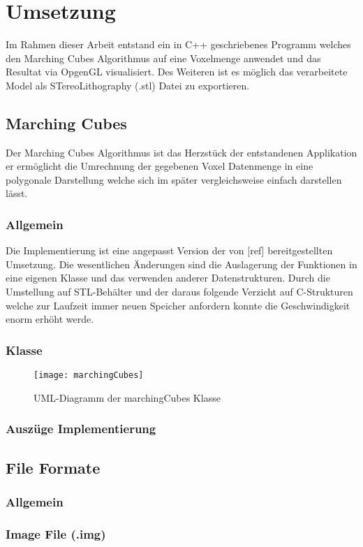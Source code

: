 \chapter{Umsetzung}
Im Rahmen dieser Arbeit entstand ein in C++ geschriebenes Programm welches den Marching Cubes Algorithmus auf eine Voxelmenge anwendet und das Resultat via OpgenGL visualisiert. Des Weiteren ist es möglich das verarbeitete Model als STereoLithography (.stl) Datei zu exportieren.
\section{Marching Cubes}
Der Marching Cubes Algorithmus ist das Herzstück der entstandenen Applikation er ermöglicht die Umrechnung der gegebenen Voxel Datenmenge in eine polygonale Darstellung welche sich im später vergleichsweise einfach darstellen lässt.
\subsection{Allgemein}
Die Implementierung ist eine angepasst Version der von [ref] bereitgestellten Umsetzung. Die wesentlichen Änderungen sind die Auslagerung der Funktionen in eine eigenen Klasse und das verwenden anderer Datenstrukturen. Durch die Umstellung auf STL-Behälter und der daraus folgende Verzicht auf C-Strukturen welche zur Laufzeit immer neuen Speicher anfordern konnte die Geschwindigkeit enorm erhöht werde.
\subsection{Klasse}
\begin{figure}[H]
	\centering
	\texttt{[image: marchingCubes]}
	\caption{UML-Diagramm der marchingCubes Klasse}
	\label{fig:marchingCubes}
\end{figure}
\subsection{Auszüge Implementierung}

\section{File Formate}

\subsection{Allgemein}
\subsection{Image File (.img)}

